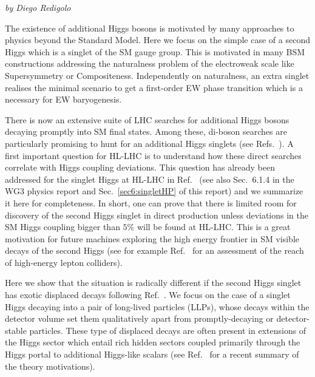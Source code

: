 \begin{center}
{\it by Diego Redigolo}
\end{center}

The existence of additional Higgs bosons is motivated by many
approaches to physics beyond the Standard Model. Here we focus on the simple case of a second Higgs which is a singlet of the SM gauge group. This is motivated in many BSM constructions addressing the naturalness problem of the electroweak scale like Supersymmetry or Compositeness. Independently on naturalness, an extra singlet realises the minimal scenario to get a first-order EW phase transition which is a necessary for EW baryogenesis. 

There is now an extensive suite of LHC searches for additional Higgs bosons decaying promptly into SM
final states. Among these, di-boson searches are particularly promising to hunt for an additional Higgs singlets (see Refs.~\cite{Sirunyan:2018qlb,Aaboud:2018knk,Sirunyan:2017isc,ATLAS:2017spa}). A first important question for HL-LHC is to understand how these direct searches correlate with Higgs coupling deviations. This question has already been addressed for the singlet Higgs at HL-LHC in Ref.~\cite{Buttazzo:2015bka} (see also Sec.~6.1.4 in the WG3 physics report \cite{CidVidal:2018eel} and Sec.~\ref{sec6:singletHP} of this report) and we summarize it here for completeness. In short, one can prove that there is limited room for discovery of the second Higgs singlet in direct production unless deviations in the SM Higgs coupling bigger than $5\%$ will be found at HL-LHC. This is a great motivation for future machines exploring the high energy frontier in SM visible decays of the second Higgs (see for example Ref.~\cite{Buttazzo:2018qqp} for an assessment of the reach of high-energy lepton colliders). 

Here we show that the situation is radically different if the second Higgs singlet has exotic displaced decays following Ref.~\cite{Alipour-fard:2018mre}. We focus on the case of a singlet Higgs decaying into a pair of long-lived particles (LLPs), whose decays within the detector volume set them qualitatively apart from promptly-decaying or detector-stable
particles. These type of displaced decays are often present in extensions of the Higgs sector which entail rich hidden sectors coupled primarily through the Higgs portal to additional Higgs-like scalars (see Ref.~\cite{Curtin:2018mvb} for a recent summary of the theory motivations).  

